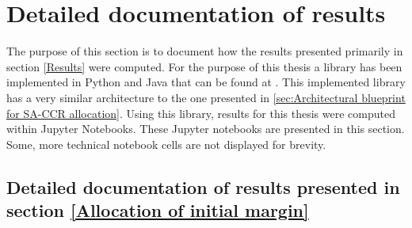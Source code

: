 \documentclass[../Thesis_AHoecherl.tex]{subfiles}
\begin{document}
    \chapter{Detailed documentation of results}\label{Detailed documentation of results}
    The purpose of this section is to document how the results presented primarily in section \ref{Results} were computed.
    For the purpose of this thesis a library has been implemented in Python and Java that can be found at \cite{Hoecherl2020}.
    This implemented library has a very similar architecture to the one presented in \ref{sec:Architectural blueprint for SA-CCR allocation}.
    Using this library, results for this thesis were computed within Jupyter Notebooks. These Jupyter notebooks are presented in this section. 
    Some, more technical notebook cells are not displayed for brevity.  


    \section{Detailed documentation of results presented in section \ref{Allocation of initial margin}}

    

    
    
    
\end{document}
